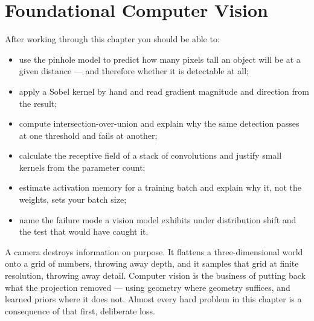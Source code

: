 
\chapter{Foundational Computer Vision}


\label{ch:computer-vision}

\begin{learningobjectives}
After working through this chapter you should be able to:
\begin{itemize}
  \item use the pinhole model to predict how many pixels tall an object will be
        at a given distance --- and therefore whether it is detectable at all;
  \item apply a Sobel kernel by hand and read gradient magnitude and direction
        from the result;
  \item compute intersection-over-union and explain why the same detection
        passes at one threshold and fails at another;
  \item calculate the receptive field of a stack of convolutions and justify
        small kernels from the parameter count;
  \item estimate activation memory for a training batch and explain why it,
        not the weights, sets your batch size;
  \item name the failure mode a vision model exhibits under distribution shift
        and the test that would have caught it.
\end{itemize}
\end{learningobjectives}

\begin{plainlanguage}
A camera destroys information on purpose. It flattens a three-dimensional world
onto a grid of numbers, throwing away depth, and it samples that grid at finite
resolution, throwing away detail. Computer vision is the business of putting
back what the projection removed --- using geometry where geometry suffices,
and learned priors where it does not. Almost every hard problem in this chapter
is a consequence of that first, deliberate loss.
\end{plainlanguage}

